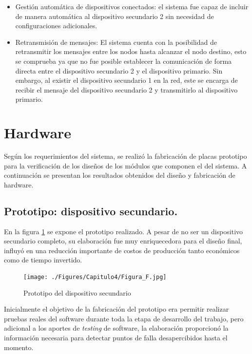 \begin{itemize}
\item Gestión automática de dispositivos conectados: el sistema fue capaz de incluir de manera automática al dispositivo secundario 2 sin necesidad de configuraciones adicionales.
\item Retransmisión de mensajes: El sistema cuenta con la posibilidad de retransmitir los mensajes entre los nodos hasta alcanzar el nodo destino, esto se comprueba ya que no fue posible establecer la comunicación de forma directa entre el dispositivo secundario 2 y el dispositivo primario. Sin embargo, al existir el dispositivo secundario 1 en la red, este se encarga de recibir el mensaje del dispositivo secundario 2 y transmitirlo al dispositivo primario.
\end{itemize}


\section{Hardware}

Según los requerimientos del sistema, se realizó la fabricación de placas prototipo para la verificación de los diseños de los módulos que componen el del sistema. A continuación se presentan los resultados obtenidos del diseño y fabricación de hardware.  

\subsection{Prototipo: dispositivo secundario.}

En la figura \ref{fig:figura_f} se expone el prototipo realizado. A pesar de no ser un dispositivo secundario completo, su elaboración fue muy enriquecedora para el diseño final, influyó en una reducción importante de costos de producción tanto económicos como de tiempo invertido.  


\begin{figure}[ht]
	\centering
	\texttt{[image: ./Figures/Capitulo4/Figura\_F.jpg]}
	\caption{Prototipo del dispositivo secundario}
	\label{fig:figura_f}
\end{figure}


Inicialmente el objetivo de la fabricación del prototipo era permitir realizar pruebas reales del software durante toda la etapa de desarrollo del trabajo, pero adicional a los aportes de \textit{testing} de software, la elaboración proporcionó la información necesaria para detectar puntos de falla desapercibidos hasta el momento.


